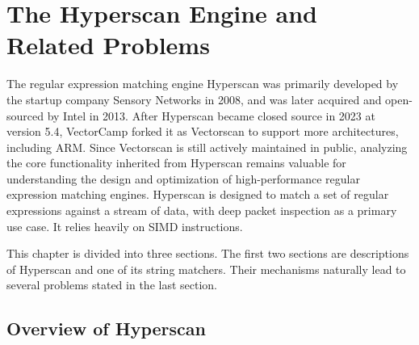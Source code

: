 \chapter[The Hyperscan Engine and Related Problems]{The Hyperscan Engine and \\ Related Problems}

The regular expression matching engine Hyperscan \cite{wang2019hyperscan} was primarily developed by the startup company Sensory Networks in 2008, and was later acquired and open-sourced by Intel in 2013. After Hyperscan became closed source in 2023 at version 5.4, VectorCamp forked it as Vectorscan \cite{vectorscan} to support more architectures, including ARM. Since Vectorscan is still actively maintained in public, analyzing the core functionality inherited from Hyperscan remains valuable for understanding the design and optimization of high-performance regular expression matching engines. Hyperscan is designed to match a set of regular expressions against a stream of data, with deep packet inspection as a primary use case. It relies heavily on SIMD instructions.

This chapter is divided into three sections. The first two sections are descriptions of Hyperscan and one of its string matchers. Their mechanisms naturally lead to several problems stated in the last section.







\section{Overview of Hyperscan}

